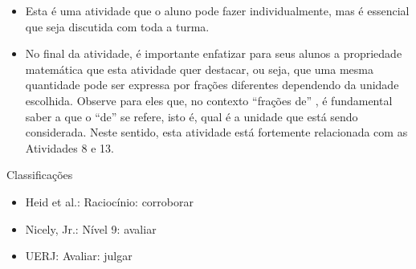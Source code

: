 \begin{multicols}{2}
\begin{itemize} %
    \item       Esta é uma atividade que o aluno pode fazer individualmente, mas é essencial que seja discutida com toda a turma.
    \item       No final da atividade, é importante enfatizar para seus alunos a propriedade matemática que esta atividade quer destacar, ou seja, que uma mesma quantidade pode ser expressa por frações diferentes dependendo da unidade escolhida. Observe para eles que, no contexto       ``frações de''      , é fundamental saber a que o       ``de''       se refere, isto é, qual é a unidade que está sendo considerada. Neste sentido, esta atividade está fortemente relacionada com as Atividades 8 e 13.
\end{itemize} %


  Classificações
\begin{itemize} %
    \item       Heid et al.: Raciocínio: corroborar
    \item       Nicely, Jr.: Nível 9: avaliar
    \item       UERJ: Avaliar: julgar
\end{itemize} %



\end{multicols}
